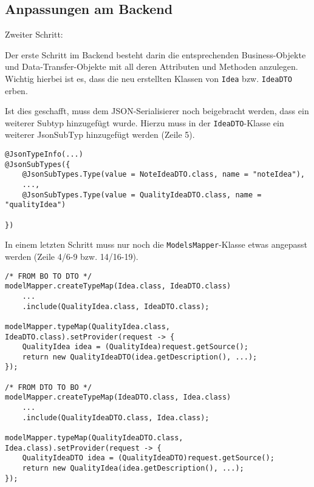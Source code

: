 \subsection{Anpassungen am Backend}
\begin{labeling}{Zweiter Schritt:}
	\item [Erster Schritt:] Der erste Schritt im Backend besteht darin die entsprechenden Business-Objekte und Data-Transfer-Objekte mit all deren Attributen und Methoden anzulegen. Wichtig hierbei ist es, dass die neu erstellten Klassen von \texttt{Idea} bzw. \texttt{IdeaDTO} erben.
	\item [Zweiter Schritt:] Ist dies geschafft, muss dem JSON-Serialisierer noch beigebracht werden, dass ein weiterer Subtyp hinzugefügt wurde. Hierzu muss in der \texttt{IdeaDTO}-Klasse ein weiterer JsonSubTyp hinzugefügt werden (Zeile 5).
	
\begin{lstlisting}[caption={Weiterer Ideen-Typ hinzufügen in der IdeaDTO-Klasse}, label=addIdeaType]
@JsonTypeInfo(...)
@JsonSubTypes({
    @JsonSubTypes.Type(value = NoteIdeaDTO.class, name = "noteIdea"),
    ...,
    @JsonSubTypes.Type(value = QualityIdeaDTO.class, name = "qualityIdea")
        
})
\end{lstlisting}

	\item [Dritter Schritt:] In einem letzten Schritt muss nur noch die \texttt{ModelsMapper}-Klasse etwas angepasst werden (Zeile 4/6-9 bzw. 14/16-19). 

\begin{lstlisting}[caption={Weiterer Ideen-Typ hinzufügen in der ModelsMapper-Klasse}]
/* FROM BO TO DTO */
modelMapper.createTypeMap(Idea.class, IdeaDTO.class)
    ...
    .include(QualityIdea.class, IdeaDTO.class);

modelMapper.typeMap(QualityIdea.class, IdeaDTO.class).setProvider(request -> {
    QualityIdea idea = (QualityIdea)request.getSource();
    return new QualityIdeaDTO(idea.getDescription(), ...);
});

/* FROM DTO TO BO */
modelMapper.createTypeMap(IdeaDTO.class, Idea.class)
    ...
    .include(QualityIdeaDTO.class, Idea.class);

modelMapper.typeMap(QualityIdeaDTO.class, Idea.class).setProvider(request -> {
    QualityIdeaDTO idea = (QualityIdeaDTO)request.getSource();
    return new QualityIdea(idea.getDescription(), ...);
});
\end{lstlisting}
\end{labeling}

